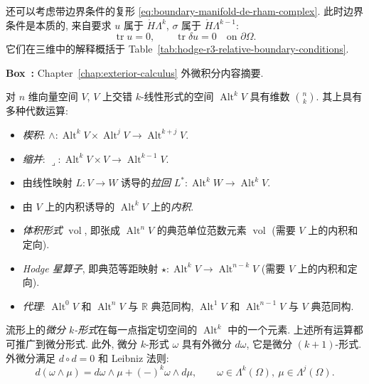 {还可以考虑带边界条件的复形 \eqref{eq:boundary-manifold-de-rham-complex}. 此时边界条件是本质的, 来自要求 $u$ 属于 $\mathring H\Lambda^k$, $\sigma$ 属于 $\mathring H\Lambda^{k-1}$:}
\[
\operatorname{tr}u=0,\qquad\operatorname{tr}\delta u=0\quad\text{on }\partial\Omega.
\]
{它们在三维中的解释概括于 Table~\ref{tab:hodge-r3-relative-boundary-conditions}.}

\begin{tcolorbox}[enhanced,breakable,colback=KuangNei,frame hidden,boxrule=0pt,sharpish corners,before skip=10pt,after skip=10pt]
\label{box:exterior-calculus-summary}
\noindent\textbf{Box~\thebooksummary:} {Chapter~\ref{chap:exterior-calculus} 外微积分内容摘要.}\par

{对 $n$ 维向量空间 $V$, $V$ 上交错 $k$-线性形式的空间 $\operatorname{Alt}^kV$ 具有维数 $\binom nk$. 其上具有多种代数运算:}
\begin{itemize}
\item{\emph{楔积}: $\wedge:\operatorname{Alt}^kV\times\operatorname{Alt}^jV\to\operatorname{Alt}^{k+j}V$.}
\item{\emph{缩并}: $\lrcorner:\operatorname{Alt}^kV\times V\to\operatorname{Alt}^{k-1}V$.}
\item{由线性映射 $L:V\to W$ 诱导的\emph{拉回} $L^*:\operatorname{Alt}^kW\to\operatorname{Alt}^kV$.}
\item{由 $V$ 上的内积诱导的 $\operatorname{Alt}^kV$ 上的\emph{内积}.}
\item{\emph{体积形式} $\operatorname{vol}$, 即张成 $\operatorname{Alt}^nV$ 的典范单位范数元素 $\operatorname{vol}$ (需要 $V$ 上的内积和定向).}
\item{\emph{Hodge 星算子}, 即典范等距映射 $\star:\operatorname{Alt}^kV\to\operatorname{Alt}^{n-k}V$ (需要 $V$ 上的内积和定向).}
\item{\emph{代理}: $\operatorname{Alt}^0V$ 和 $\operatorname{Alt}^nV$ 与 $\mathbb R$ 典范同构, $\operatorname{Alt}^1V$ 和 $\operatorname{Alt}^{n-1}V$ 与 $V$ 典范同构.}
\end{itemize}

{流形上的\emph{微分 $k$-形式}在每一点指定切空间的 $\operatorname{Alt}^k$ 中的一个元素. 上述所有运算都可推广到微分形式. 此外, 微分 $k$-形式 $\omega$ 具有外微分 $d\omega$, 它是微分 $(k+1)$-形式. 外微分满足 $d\circ d=0$ 和 Leibniz 法则:}
\[
d(\omega\wedge\mu)=d\omega\wedge\mu+(-)^k\omega\wedge d\mu,\qquad\omega\in\Lambda^k(\Omega),\ \mu\in\Lambda^j(\Omega).
\]


\end{tcolorbox}
